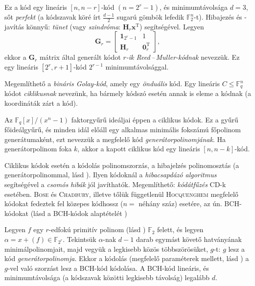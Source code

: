 \documentclass[%
	DIV=15,appendixprefix]{scrreprt}
\theoremstyle{definition}
\theoremstyle{remark}
\DeclareMathOperator{\T}{T}
\begin{document}
Ez a kód egy lineáris $ \left[ n,{} n - r  \right] $-kód $ \left( n = 2^{ r } - 1 \right) $, és
minimumtávolsága $ d = 3 $, sőt \emph{perfekt} (a
kódszavak köré írt $ \frac{ d - 1 }{ 2 } $ sugarú gömbök lefedik $ \mathbb{ F }_{ 2 }^{ n } $-t).
Hibajezés és -javítás könnyű: \emph{tünet} (vagy \emph{szindróma}: $ \mathbf{ H }_{ r }
\mathbf{ x }^{ \T } $)
segítségével.
%
Legyen
\begin{equation*}
	\mathbf{ G }_{ r } = \begin{bmatrix}
		\mathbf{ 1 }_{ 2^{ r } - 1 }	&	1\\
		\mathbf{ H }_{ r }				&	\mathbf{ 0 }_{ r }^{ \T }
	\end{bmatrix},
\end{equation*}
ekkor a $ \mathbf{ G }_{ r } $ mátrix által generált kódot \emph{$ r $-ik Reed\,--\,Muller-kódnak}
nevezzük. Ez egy lineáris $ \left[ 2^{ r },{} r + 1 \right] $-kód $ 2^{ r  - 1 } $
minimumtávolsággal.

Megemlíthető a \emph{bináris Golay-kód}, amely egy \emph{önduális} kód.
%
Egy lineáris $ C \le \mathbb{ F }_{ q }^{ n } $ kódot \emph{ciklikusnak} nevezünk, ha bármely
kódszó esetén annak  is eleme a kódnak (a koordináták
 zárt a kód).

Az $ \mathbb{ F }_{ q } \left[ x \right] / \left( x^{ n } - 1 \right) $ faktorgyűrű ideáljai éppen a
ciklikus kódok. Ez a gyűrű főideálgyűrű, és minden idál előáll egy alkalmas minimális fokszámú
főpolinom generátumaként, ezt nevezzük a megfelelő kód \emph{generátorpolinomjának}. Ha
generátorpolinom foka $ k $, akkor a kapott ciklikus kód egy lineáris $ \left[ n,{} n - k
\right] $-kód.

Ciklikus kódok esetén a kódolás polinomszorzás, a hibajelzés polinomosztás (a generátorpolinommal,
lásd \cite[39.~oldal]{Czedli}). Ilyen kódoknál a \emph{hibacsapdázó algoritmus} segítségével a
\emph{csomós hibák} jól javíthatók. Megemlíthető: \emph{kódátfűzés} CD-k esetében.
%
\textsc{Bose} és \textsc{Chadbury}, illetve tőlük függetlenül \textsc{Hocquenghem} megfelelő
kódokat fedeztek fel közepes kódhossz ($ n = $ néhány száz) esetére, az ún. BCH-kódokat (lásd a
BCH-kódok alaptételét \cite[3.6.~tétel, 36.~oldal]{Czedli})

Legyen $ f $ egy $ r $-edfokú primitív polinom (lásd \cite[35.~oldal]{Czedli})
$ \mathbb{ F }_{ 2 } $ felett, és legyen $ \alpha =
x + \left( f \right) \in \mathbb{ F }_{ 2^{ r } } $. Tekintsük $ \alpha $-nak $ d - 1 $ darab
egymást követő hatványának minimálpolinomjait, majd vegyük a legkisebb közös többszörösüket,
$ g $-t: $ g $ lesz a kód \emph{generátorpolinomja}. Ekkor a kódolás (megfelelő paraméterek mellett,
lásd \cite[3.7.~definíció, 38.~oldal]{Czedli}) a $ g $-vel való szorzást lesz a BCH-kód kódolása. A
BCH-kód lineáris, és minimumtávolsága (a kódszavak közötti legkisebb távolság) legalább $ d $.
\end{document}
